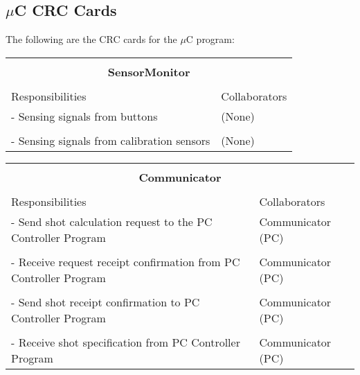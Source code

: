 \documentclass[titlepage]{article}
\begin{document}
\subsection{$\mu$C CRC Cards}
The following are the CRC cards for the $\mu$C program:\\
\begin{table}[!htbp]
\centering
\begin{tabular}{| p{} | p{} |}\hline
	\multicolumn{2}{|l|}{}\\
	\multicolumn{2}{|c|}{\large{\textbf{SensorMonitor}}}\\
	\multicolumn{2}{|l|}{}\\\hline
	\vspace{0mm}\large{Responsibilities}\vspace{2mm} &\vspace{0mm}\large{Collaborators}\vspace{2mm}\\\hline
	\vspace{0mm}- Sensing signals from buttons	&\vspace{0mm}(None)\\&\\
	- Sensing signals from calibration sensors\vspace{2mm}	&(None)\vspace{2mm}\\\hline
\end{tabular}
\end{table}
\newpage

\begin{table}[!htbp]
\centering
\begin{tabular}{| p{} | p{} |}\hline
	\multicolumn{2}{|l|}{}\\
	\multicolumn{2}{|c|}{\large{\textbf{Communicator}}}\\
	\multicolumn{2}{|l|}{}\\\hline
	\vspace{0mm}\large{Responsibilities}\vspace{2mm} &\vspace{0mm}\large{Collaborators}\vspace{2mm}\\\hline
	\vspace{0mm}- Send shot calculation request to the PC Controller Program	&\vspace{0mm}Communicator (PC)\\&\\
	- Receive request receipt confirmation from PC Controller Program			&Communicator (PC)\\&\\
	- Send shot receipt confirmation to PC Controller Program					&Communicator (PC)\\&\\
	- Receive shot specification from PC Controller Program\vspace{2mm}			&Communicator (PC)\vspace{2mm}\\\hline
\end{tabular}
\end{table}
\end{document}
